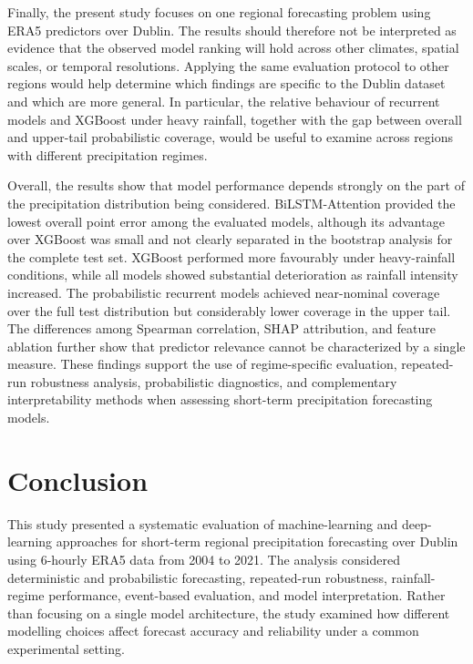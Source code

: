 \documentclass[referee,pdflatex,sn-basic]{sn-jnl}%
\theoremstyle{thmstyleone}%
\theoremstyle{thmstyletwo}%
\theoremstyle{thmstylethree}%
\begin{document}
Finally, the present study focuses on one regional forecasting problem using ERA5 predictors over Dublin. The results should therefore not be interpreted as evidence that the observed model ranking will hold across other climates, spatial scales, or temporal resolutions. Applying the same evaluation protocol to other regions would help determine which findings are specific to the Dublin dataset and which are more general. In particular, the relative behaviour of recurrent models and XGBoost under heavy rainfall, together with the gap between overall and upper-tail probabilistic coverage, would be useful to examine across regions with different precipitation regimes.

Overall, the results show that model performance depends strongly on the part of the precipitation distribution being considered. BiLSTM-Attention provided the lowest overall point error among the evaluated models, although its advantage over XGBoost was small and not clearly separated in the bootstrap analysis for the complete test set. XGBoost performed more favourably under heavy-rainfall conditions, while all models showed substantial deterioration as rainfall intensity increased. The probabilistic recurrent models achieved near-nominal coverage over the full test distribution but considerably lower coverage in the upper tail. The differences among Spearman correlation, SHAP attribution, and feature ablation further show that predictor relevance cannot be characterized by a single measure. These findings support the use of regime-specific evaluation, repeated-run robustness analysis, probabilistic diagnostics, and complementary interpretability methods when assessing short-term precipitation forecasting models.

\section{Conclusion}

This study presented a systematic evaluation of machine-learning and deep-learning approaches for short-term regional precipitation forecasting over Dublin using 6-hourly ERA5 data from 2004 to 2021. The analysis considered deterministic and probabilistic forecasting, repeated-run robustness, rainfall-regime performance, event-based evaluation, and model interpretation. Rather than focusing on a single model architecture, the study examined how different modelling choices affect forecast accuracy and reliability under a common experimental setting.
\end{document}
